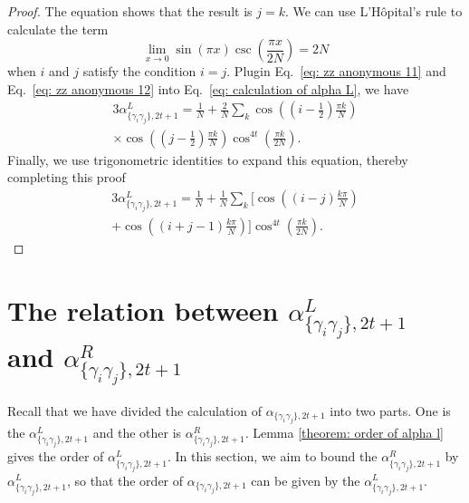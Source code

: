 \documentclass[showpacs,twocolumn,aps,prx,long bibliography,superscriptaddress,notitlepage]{revtex4-1}
\newcommand{\alpl}{\alpha_{\{\gamma_i\gamma_j\}, 2t+1}^{L}}
\newcommand{\alpr}{\alpha_{\{\gamma_i\gamma_j\}, 2t+1}^{R}}
\begin{document}
\begin{proof}
The equation shows that the result is $j=k$. We can use  L'Hôpital's rule to calculate the term
\begin{equation}
    \label{eq: zz anonymous 11}
    \lim_{x\to 0} \sin(\pi x) \csc(\frac{\pi x}{2N}) = 2N
\end{equation}
when $i$ and $j$ satisfy the condition $i=j$. Plugin Eq.~\eqref{eq: zz anonymous 11} and Eq.~\eqref{eq: zz anonymous 12} into Eq.~\eqref{eq: calculation of alpha L}, we have
\begin{equation}
    \label{eq: zz anonymous 13}
    \begin{aligned}
        3\alpl = \frac{1}{N} + \frac{2}{N} \sum_k \cos \left(\left(i-\frac{1}{2}\right) \frac{\pi k}{N}\right)\\
        \times \cos \left(\left(j-\frac{1}{2}\right) \frac{\pi k}{N}\right)\cos ^{4 t}\left( \frac{\pi k}{2 N} \right).
    \end{aligned}
\end{equation}
Finally, we use trigonometric identities to expand this equation, thereby completing this proof
\begin{equation}
    \begin{aligned}
        3\alpl=\frac{1}{N}+\frac{1}{N} \sum_k\Big[\cos \left((i-j) \frac{k \pi}{N}\right)\\
        +\cos \left((i+j-1) \frac{k \pi}{N}\right)\Big] \cos ^{4 t}\left(\frac{\pi k}{2 N}\right).
    \end{aligned}
\end{equation}
\end{proof}



\section{The relation between $\alpl$ and $\alpr$}
\label{appendix relation between alphaL and alpha}
Recall that we have divided the calculation of $\alpha_{\{\gamma_i\gamma_j\}, 2t+1}$ into two parts. One is the $\alpl$ and the other is $\alpr$. Lemma \ref{theorem: order of alpha l} gives the order of $\alpl$. In this section, we aim to bound the $\alpr$ by $\alpl$, so that the order of $\alpha_{\{\gamma_i\gamma_j\}, 2t+1}$ can be given by the $\alpl$.
\end{document}
